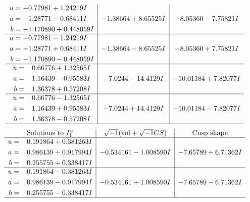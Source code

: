 \documentclass[1p]{elsarticle_modified}
\theoremstyle{definition}
\newcommand{\I}{\sqrt{-1}}
\begin{document}
$$\begin{array}{c|c|c}
\begin{aligned}
u &= -0.77981 + 1.24219 I \\
a &= -1.28771 - 0.68411 I \\
b &= -1.170890 + 0.448059 I\end{aligned}
 & -1.38664 + 8.65525 I & -8.05360 - 7.75821 I \\ \hline\begin{aligned}
u &= -0.77981 - 1.24219 I \\
a &= -1.28771 + 0.68411 I \\
b &= -1.170890 - 0.448059 I\end{aligned}
 & -1.38664 - 8.65525 I & -8.05360 + 7.75821 I \\ \hline\begin{aligned}
u &= \phantom{-}0.66776 + 1.32565 I \\
a &= \phantom{-}1.16439 - 0.95583 I \\
b &= \phantom{-}1.36378 + 0.57208 I\end{aligned}
 & -7.0244 - 14.4129 I & -10.01184 + 7.82077 I \\ \hline\begin{aligned}
u &= \phantom{-}0.66776 - 1.32565 I \\
a &= \phantom{-}1.16439 + 0.95583 I \\
b &= \phantom{-}1.36378 - 0.57208 I\end{aligned}
 & -7.0244 + 14.4129 I & -10.01184 - 7.82077 I\\
 \hline 
 \end{array}$$\newpage$$\begin{array}{c|c|c}  
\text{Solutions to }I^u_{1}& \I (\text{vol} + \sqrt{-1}CS) & \text{Cusp shape}\\
 \hline 
\begin{aligned}
u &= \phantom{-}0.191864 + 0.381263 I \\
a &= \phantom{-}0.986139 + 0.917994 I \\
b &= \phantom{-}0.255755 + 0.338417 I\end{aligned}
 & -0.534161 - 1.008590 I & -7.65789 + 6.71362 I \\ \hline\begin{aligned}
u &= \phantom{-}0.191864 - 0.381263 I \\
a &= \phantom{-}0.986139 - 0.917994 I \\
b &= \phantom{-}0.255755 - 0.338417 I\end{aligned}
 & -0.534161 + 1.008590 I & -7.65789 - 6.71362 I\\
 \hline 
 \end{array}$$\newpage\newpage\renewcommand{\arraystretch}{1}
\end{document}
